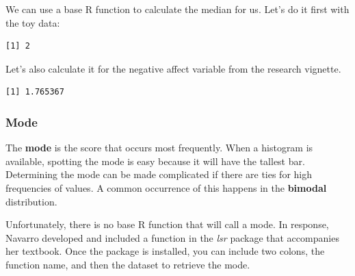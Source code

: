 \documentclass[
  11pt,
]{book}
\newenvironment{Shaded}{\begin{snugshade}}{\end{snugshade}}
\newcommand{\AttributeTok}[1]{\textcolor[rgb]{0.27,0.27,0.27}{#1}}
\newcommand{\ConstantTok}[1]{\textcolor[rgb]{0.37,0.37,0.37}{#1}}
\newcommand{\FunctionTok}[1]{\textcolor[rgb]{0.27,0.27,0.27}{\textbf{#1}}}
\newcommand{\NormalTok}[1]{#1}
\newcommand{\SpecialCharTok}[1]{\textcolor[rgb]{0.43,0.43,0.43}{\textbf{#1}}}
\begin{document}
We can use a base R function to calculate the median for us. Let's do it first with the toy data:

\begin{Shaded}
\end{Shaded}

\begin{verbatim}
[1] 2
\end{verbatim}

Let's also calculate it for the negative affect variable from the research vignette.

\begin{Shaded}
\end{Shaded}

\begin{verbatim}
[1] 1.765367
\end{verbatim}

\hypertarget{mode}{%
\subsubsection{Mode}\label{mode}}

The \textbf{mode} is the score that occurs most frequently. When a histogram is available, spotting the mode is easy because it will have the tallest bar. Determining the mode can be made complicated if there are ties for high frequencies of values. A common occurrence of this happens in the \textbf{bimodal} distribution.

Unfortunately, there is no base R function that will call a mode. In response, Navarro developed and included a function in the \emph{lsr} package that accompanies her \citeyearpar{navarro_book_2020} textbook. Once the package is installed, you can include two colons, the function name, and then the dataset to retrieve the mode.

\begin{Shaded}
\end{Shaded}
\end{document}
